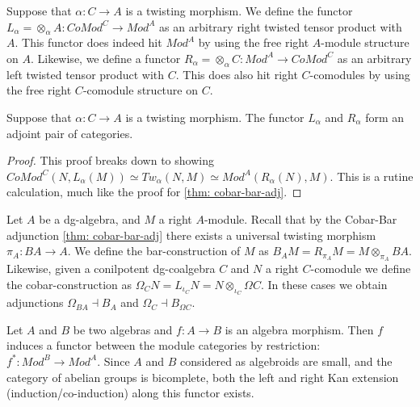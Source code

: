 \documentclass[../thesis.tex]{subfiles}
\begin{document}
            Suppose that $\alpha : C \rightarrow A$ is a twisting morphism. We define the functor $L_\alpha = \otimes_\alpha A : CoMod^C \rightarrow Mod^A$ as an arbitrary right twisted tensor product with $A$. This functor does indeed hit $Mod^A$ by using the free right $A$-module structure on $A$. Likewise, we define a functor $R_\alpha = \otimes_\alpha C : Mod^A \rightarrow CoMod^C$ as an arbitrary left twisted tensor product with $C$. This does also hit right $C$-comodules by using the free right $C$-comodule structure on $C$.

            \begin{proposition}
                Suppose that $\alpha : C \rightarrow A$ is a twisting morphism. The functor $L_\alpha$ and $R_\alpha$ form an adjoint pair of categories.
                \begin{center}
                \end{center}
            \end{proposition}

            \begin{proof}
                This proof breaks down to showing $CoMod^C(N, L_\alpha(M))\simeq Tw_\alpha(N,M) \simeq Mod^A(R_\alpha(N),M)$. This is a rutine calculation, much like the proof for \ref{thm: cobar-bar-adj}.
            \end{proof}

            Let $A$ be a dg-algebra, and $M$ a right $A$-module. Recall that by the Cobar-Bar adjunction \ref{thm: cobar-bar-adj} there exists a universal twisting morphism $\pi_A : BA \rightarrow A$. We define the bar-construction of $M$ as $B_AM = R_{\pi_A}M = M\otimes_{\pi_A}BA$. Likewise, given a conilpotent dg-coalgebra $C$ and $N$ a right $C$-comodule we define the cobar-construction as $\Omega_CN = L_{\iota_C}N = N\otimes_{\iota_C}\Omega C$. In these cases we obtain adjunctions $\Omega_{BA} \dashv B_A$ and $\Omega_C \dashv B_{\Omega C}$.

            Let $A$ and $B$ be two algebras and $f : A \rightarrow B$ is an algebra morphism. Then $f$ induces a functor between the module categories by restriction: $f^* : Mod^B \rightarrow Mod^A$. Since $A$ and $B$ considered as algebroids are small, and the category of abelian groups is bicomplete, both the left and right Kan extension (induction/co-induction) along this functor exists.
            \begin{center}
            \end{center}
\end{document}
